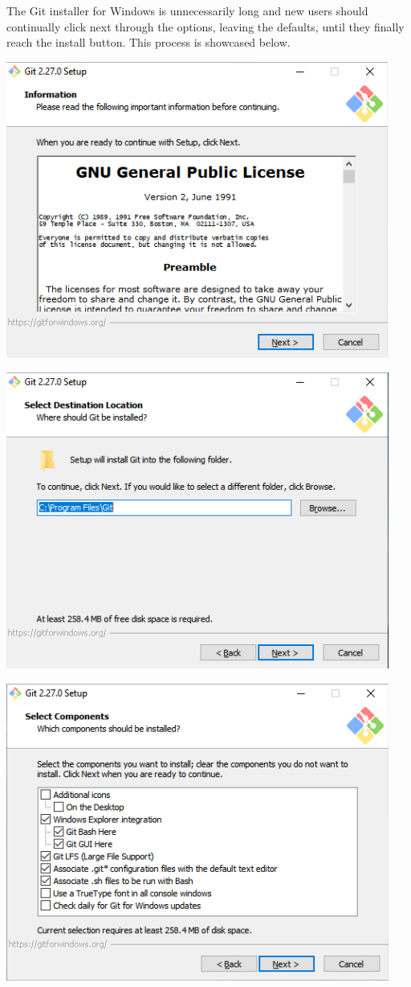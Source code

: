 \documentclass[
]{book}
\begin{document}
The Git installer for Windows is unnecessarily long and new users should continually click next through the options, leaving the defaults, until they finally reach the install button. This process is showcased below.

\includegraphics{images/05-git_2.png}

\includegraphics{images/05-git_3.png}

\includegraphics{images/05-git_4.png}
\end{document}
